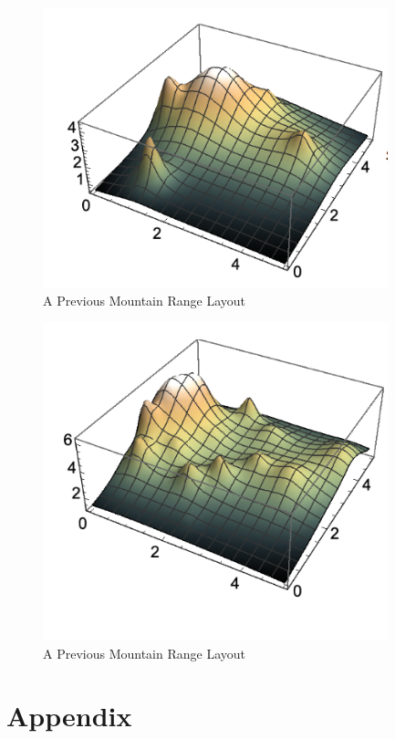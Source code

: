 \documentclass[12pt]{article}   %
\theoremstyle{definition}
\numberwithin{equation}{section}
\begin{document}
\begin{figure} [h]
  \centering
  \includegraphics[width=10cm]{../images/mtn2.png}
  \caption{A Previous Mountain Range Layout}
\end{figure}

\begin{figure} [h]
  \centering
  \includegraphics[width=10cm]{../images/mtn3.png}
  \caption{A Previous Mountain Range Layout}
\end{figure}
\newpage
\section{Appendix} \label{APPM2350proj02sec08}


\end{document}
